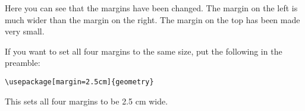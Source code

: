 \documentclass[a4paper,12pt]{article}
\begin{document}
Here you can see that the margins have been changed. The margin on the left is much wider than the margin on the right. The margin on the top has been made very small.

If you want to set all four margins to the same size, put the following in the preamble:

\begin{verbatim}
\usepackage[margin=2.5cm]{geometry}
\end{verbatim}

This sets all four margins to be 2.5 cm wide.
\end{document}
